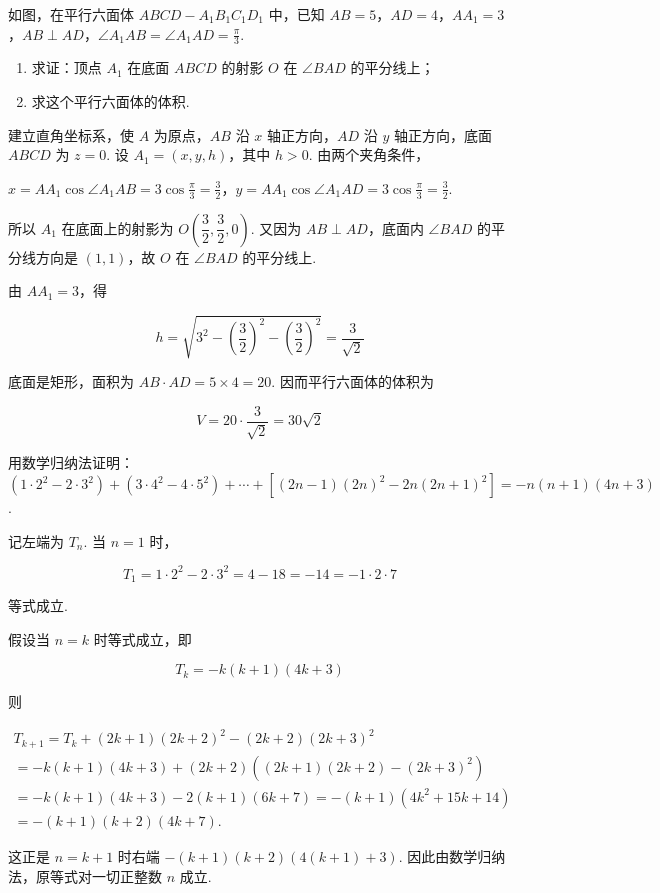 \begin{problem}
如图，在平行六面体 \(ABCD - A_1B_1C_1D_1\) 中，已知 \(AB = 5\)，\(AD = 4\)，\(AA_1 = 3\)，\(AB \perp AD\)，\(\angle A_1AB = \angle A_1AD = \frac{\pi}{3}\).

\begin{enumerate}
\item 求证：顶点 \(A_1\) 在底面 \(ABCD\) 的射影 \(O\) 在 \(\angle BAD\) 的平分线上；
\item 求这个平行六面体的体积.
\end{enumerate}

\end{problem}

\begin{solution}
建立直角坐标系，使 \(A\) 为原点，\(AB\) 沿 \(x\) 轴正方向，\(AD\) 沿 \(y\) 轴正方向，底面 \(ABCD\) 为 \(z=0\). 设 \(A_1=(x,y,h)\)，其中 \(h>0\). 由两个夹角条件，

\(x=AA_1\cos\angle A_1AB=3\cos\frac\pi3=\frac32\)，\(y=AA_1\cos\angle A_1AD=3\cos\frac\pi3=\frac32\).

所以 \(A_1\) 在底面上的射影为 \(O\left(\dfrac32,\dfrac32,0\right)\). 又因为 \(AB\perp AD\)，底面内 \(\angle BAD\) 的平分线方向是 \((1,1)\)，故 \(O\) 在 \(\angle BAD\) 的平分线上.

由 \(AA_1=3\)，得

\[h=\sqrt{3^2-\left(\frac32\right)^2-\left(\frac32\right)^2}=\frac{3}{\sqrt2}\]

底面是矩形，面积为 \(AB\cdot AD=5\times4=20\). 因而平行六面体的体积为

\[V=20\cdot\frac{3}{\sqrt2}=30\sqrt2\]
\end{solution}

\begin{problem}
用数学归纳法证明：\((1 \cdot 2^2 - 2 \cdot 3^2) + (3 \cdot 4^2 - 4 \cdot 5^2) + \cdots + [(2n - 1)(2n)^2 - 2n(2n + 1)^2] = -n(n + 1)(4n + 3)\).
\end{problem}

\begin{solution}
记左端为 \(T_n\). 当 \(n=1\) 时，

\[T_1=1\cdot2^2-2\cdot3^2=4-18=-14=-1\cdot2\cdot7\]

等式成立.

假设当 \(n=k\) 时等式成立，即

\[T_k=-k(k+1)(4k+3)\]

则

\[\begin{gathered}T_{k+1}=T_k+(2k+1)(2k+2)^2-(2k+2)(2k+3)^2\\=-k(k+1)(4k+3)+(2k+2)\left((2k+1)(2k+2)-(2k+3)^2\right)\\=-k(k+1)(4k+3)-2(k+1)(6k+7)=-(k+1)(4k^2+15k+14)\\=-(k+1)(k+2)(4k+7).\end{gathered}\]

这正是 \(n=k+1\) 时右端 \(-(k+1)(k+2)\left(4(k+1)+3\right)\). 因此由数学归纳法，原等式对一切正整数 \(n\) 成立.
\end{solution}

